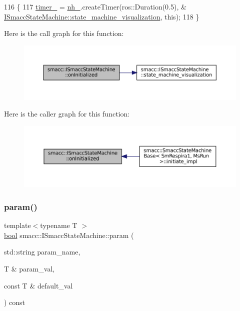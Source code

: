 \begin{DoxyCode}
116 \{
117     \hyperlink{classsmacc_1_1ISmaccStateMachine_ab6b00dc92aa86f1074d795fb4057e5bc}{timer\_} = \hyperlink{classsmacc_1_1ISmaccStateMachine_ad8877bcca9dbb345fe72cca839c93dd3}{nh\_}.createTimer(ros::Duration(0.5), &
      \hyperlink{classsmacc_1_1ISmaccStateMachine_ac03029f770422d0ea77ea9856b8cb1a8}{ISmaccStateMachine::state\_machine\_visualization}, \textcolor{keyword}{this});
118 \}
\end{DoxyCode}
Here is the call graph for this function\+:
\nopagebreak
\begin{figure}[H]
\begin{center}
\leavevmode
\includegraphics[width=350pt]{classsmacc_1_1ISmaccStateMachine_a95e7f71d0d88fffd0afebb1f9ccdade5_cgraph}
\end{center}
\end{figure}
Here is the caller graph for this function\+:
\nopagebreak
\begin{figure}[H]
\begin{center}
\leavevmode
\includegraphics[width=350pt]{classsmacc_1_1ISmaccStateMachine_a95e7f71d0d88fffd0afebb1f9ccdade5_icgraph}
\end{center}
\end{figure}
\mbox{\label{classsmacc_1_1ISmaccStateMachine_a2900ef881968af90562abfc9103570f3}} 
\subsubsection{\texorpdfstring{param()}{param()}}
{\footnotesize\ttfamily template$<$typename T $>$ \\
\hyperlink{classbool}{bool} smacc\+::\+I\+Smacc\+State\+Machine\+::param (\begin{DoxyParamCaption}\item[{std\+::string}]{param\+\_\+name,  }\item[{T \&}]{param\+\_\+val,  }\item[{const T \&}]{default\+\_\+val }\end{DoxyParamCaption}) const\hspace{0.3cm}{\ttfamily [protected]}}



